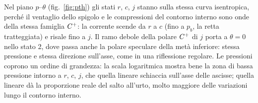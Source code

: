 
Nel piano $p$--$\theta$ (fig.~\ref{fig:pth}) gli stati $r$, $c$, $j$ stanno sulla stessa curva isentropica, perché
il ventaglio dello spigolo e le compressioni del contorno interno sono onde della stessa famiglia $C^{+}$: la corrente
scende da $r$ a $c$ (fino a $p_b$, la retta tratteggiata) e risale fino a $j$. Il ramo debole della polare $C^{+}$ di
$j$ porta a $\theta=0$ nello stato 2, dove passa anche la polare speculare della metà inferiore: stessa pressione e
stessa direzione sull'asse, come in una riflessione regolare. Le pressioni coprono un ordine di grandezza: la scala
logaritmica mostra bene la zona di bassa pressione intorno a $r$, $c$, $j$, che quella lineare schiaccia sull'asse
delle ascisse; quella lineare dà la proporzione reale del salto all'urto, molto maggiore delle variazioni lungo il
contorno interno.

